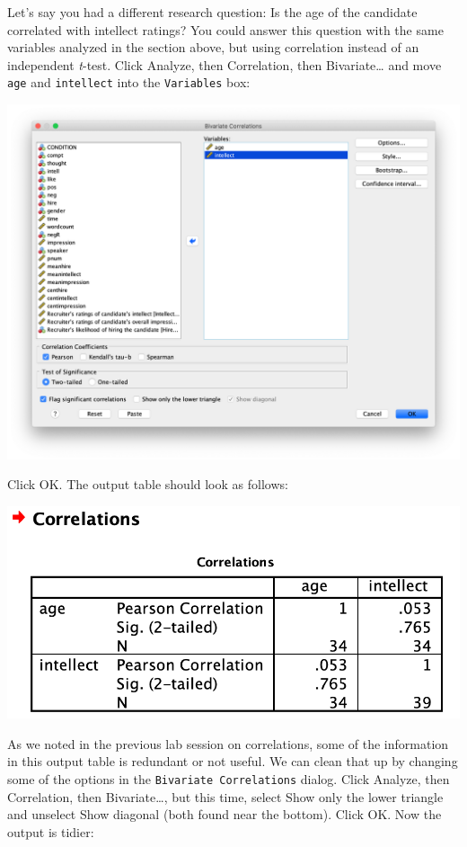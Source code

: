 \documentclass[
]{book}
\begin{document}
Let's say you had a different research question: Is the age of the candidate correlated with intellect ratings? You could answer this question with the same variables analyzed in the section above, but using correlation instead of an independent \emph{t}-test. Click {Analyze}, then {Correlation}, then {Bivariate\ldots{}} and move \texttt{age} and \texttt{intellect} into the \texttt{Variables} box:

\includegraphics{img/7.4.26.png}

Click {OK}. The output table should look as follows:

\includegraphics{img/7.4.27.png}

As we noted in the previous lab session on correlations, some of the information in this output table is redundant or not useful. We can clean that up by changing some of the options in the \texttt{Bivariate\ Correlations} dialog. Click {Analyze}, then {Correlation}, then {Bivariate\ldots{}}, but this time, select {Show only the lower triangle} and unselect {Show diagonal} (both found near the bottom). Click {OK}. Now the output is tidier:
\end{document}
